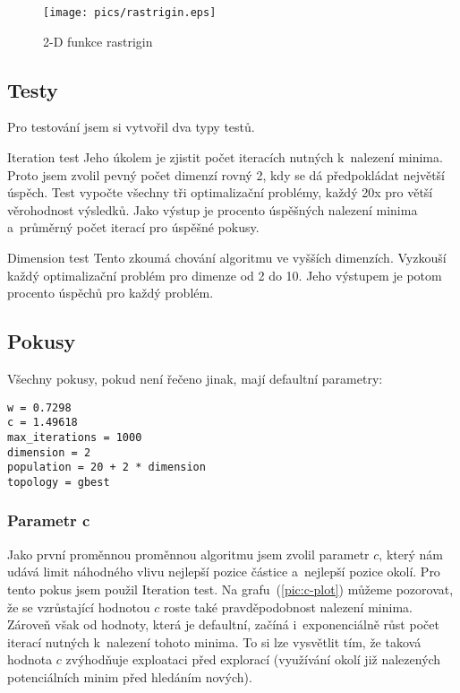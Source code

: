 \documentclass[12pt,a4paper,fleqn]{article}
\begin{document}
\begin{figure*}[h]
\centering
\texttt{[image: pics/rastrigin.eps]}
\caption{2-D funkce rastrigin}
\end{figure*}

\subsection{Testy} \label{sec:testy}
Pro testování jsem si vytvořil dva typy testů.
\begin{description}
\item{Iteration test} Jeho úkolem je zjistit počet iteracích nutných k~nalezení minima. Proto jsem zvolil pevný počet dimenzí rovný 2, kdy se dá předpokládat největší úspěch. Test vypočte všechny tři optimalizační problémy, každý 20x pro větší věrohodnost výsledků. Jako výstup je procento úspěšných nalezení minima a~průměrný počet iterací pro úspěšné pokusy.
\item{Dimension test} Tento zkoumá chování algoritmu ve vyšších dimenzích. Vyzkouší každý optimalizační problém pro dimenze od 2 do 10. Jeho výstupem je potom procento úspěchů pro každý problém.
\end{description}

\subsection{Pokusy} \label{sec:pokusy}
Všechny pokusy, pokud není řečeno jinak, mají defaultní parametry:
\begin{verbatim}
w = 0.7298
c = 1.49618
max_iterations = 1000
dimension = 2
population = 20 + 2 * dimension
topology = gbest
\end{verbatim}

\subsubsection*{Parametr c}
Jako první proměnnou proměnnou algoritmu jsem zvolil parametr $c$, který nám udává limit náhodného vlivu nejlepší pozice částice a~nejlepší pozice okolí. Pro tento pokus jsem použil Iteration test. Na grafu~(\ref{pic:c-plot}) můžeme pozorovat, že se vzrůstající hodnotou $c$ roste také pravděpodobnost nalezení minima. Zároveň však od hodnoty, která je defaultní, začíná i~exponenciálně růst počet iterací nutných k~nalezení tohoto minima. To si lze vysvětlit tím, že taková hodnota $c$ zvýhodňuje exploataci před explorací (využívání okolí již nalezených potenciálních minim před hledáním nových).
\end{document}
